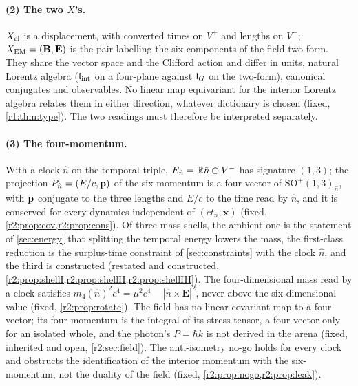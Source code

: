 \paragraph{(2) The two $X$'s.} $X_{\rm cl}$ is a displacement, with converted times on $V^+$ and lengths on $V^-$; $X_{\rm EM}=(\mathbf B,\mathbf E)$ is
the pair labelling the six components of the field two-form. They share the vector space and the Clifford action and differ in units,
natural Lorentz algebra ($\mathfrak l_{\rm int}$ on a four-plane against $\mathfrak l_G$ on the two-form), canonical conjugates and observables. No linear
map equivariant for the interior Lorentz algebra relates them in either direction, whatever dictionary is chosen (fixed,
\cref{r1:thm:type}). The two readings must therefore be interpreted separately.

\paragraph{(3) The four-momentum.} With a clock $\hat n$ on the temporal triple, $E_{\hat n}=\mathbb{R} \hat n\oplus V^-$ has signature $(1,3)$; the projection
$P_{\hat n}=(E/c,\mathbf p)$ of the six-momentum is a four-vector of $\mathrm{SO}^+(1,3)_{\hat n}$, with $\mathbf p$ conjugate to the three lengths and $E/c$ to the
time read by $\hat n$, and it is conserved for every dynamics independent of $(ct_{\hat n},\mathbf x)$ (fixed, \cref{r2:prop:cov,r2:prop:cons}). Of three mass shells, the ambient one is the statement of \cref{sec:energy} that splitting the temporal energy lowers the mass, the first-class reduction is the surplus-time constraint of \cref{sec:constraints} with the clock $\hat n$, and the third is constructed (restated and
constructed, \cref{r2:prop:shellI,r2:prop:shellII,r2:prop:shellIII}). The four-dimensional mass read by a clock satisfies
$m_4(\hat n)^2c^4=\mu^2c^4-|\hat n\times\mathbf E|^2$, never above the six-dimensional value (fixed, \cref{r2:prop:rotate}). The field has no linear
covariant map to a four-vector; its four-momentum is the integral of its stress tensor, a four-vector only for an isolated whole, and
the photon's $P=\hbar k$ is not derived in the arena (fixed, inherited and open, \cref{r2:sec:field}). The anti-isometry no-go holds for
every clock and obstructs the identification of the interior momentum with the six-momentum, not the duality of the field
(fixed, \cref{r2:prop:nogo,r2:prop:leak}).

